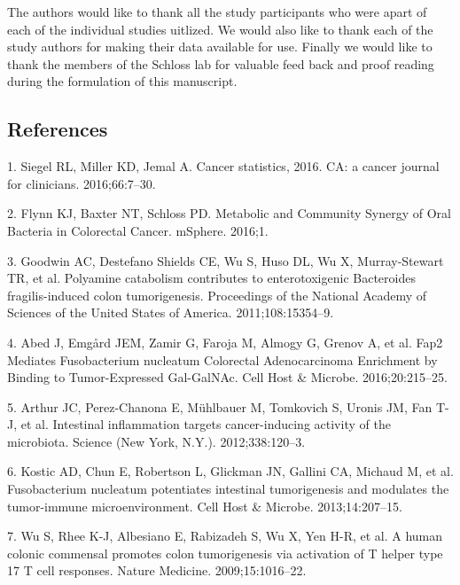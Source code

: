 \documentclass[12pt,]{article}
\begin{document}
The authors would like to thank all the study participants who were
apart of each of the individual studies uitlized. We would also like to
thank each of the study authors for making their data available for use.
Finally we would like to thank the members of the Schloss lab for
valuable feed back and proof reading during the formulation of this
manuscript.

\newpage

\subsection{References}\label{references}

\hypertarget{refs}{}
\hypertarget{ref-siegel_cancer_2016}{}
1. Siegel RL, Miller KD, Jemal A. Cancer statistics, 2016. CA: a cancer
journal for clinicians. 2016;66:7--30.

\hypertarget{ref-flynn_metabolic_2016}{}
2. Flynn KJ, Baxter NT, Schloss PD. Metabolic and Community Synergy of
Oral Bacteria in Colorectal Cancer. mSphere. 2016;1.

\hypertarget{ref-goodwin_polyamine_2011}{}
3. Goodwin AC, Destefano Shields CE, Wu S, Huso DL, Wu X, Murray-Stewart
TR, et al. Polyamine catabolism contributes to enterotoxigenic
Bacteroides fragilis-induced colon tumorigenesis. Proceedings of the
National Academy of Sciences of the United States of America.
2011;108:15354--9.

\hypertarget{ref-abed_fap2_2016}{}
4. Abed J, Emgård JEM, Zamir G, Faroja M, Almogy G, Grenov A, et al.
Fap2 Mediates Fusobacterium nucleatum Colorectal Adenocarcinoma
Enrichment by Binding to Tumor-Expressed Gal-GalNAc. Cell Host \&
Microbe. 2016;20:215--25.

\hypertarget{ref-arthur_intestinal_2012}{}
5. Arthur JC, Perez-Chanona E, Mühlbauer M, Tomkovich S, Uronis JM, Fan
T-J, et al. Intestinal inflammation targets cancer-inducing activity of
the microbiota. Science (New York, N.Y.). 2012;338:120--3.

\hypertarget{ref-kostic_fusobacterium_2013}{}
6. Kostic AD, Chun E, Robertson L, Glickman JN, Gallini CA, Michaud M,
et al. Fusobacterium nucleatum potentiates intestinal tumorigenesis and
modulates the tumor-immune microenvironment. Cell Host \& Microbe.
2013;14:207--15.

\hypertarget{ref-wu_human_2009}{}
7. Wu S, Rhee K-J, Albesiano E, Rabizadeh S, Wu X, Yen H-R, et al. A
human colonic commensal promotes colon tumorigenesis via activation of T
helper type 17 T cell responses. Nature Medicine. 2009;15:1016--22.
\end{document}
